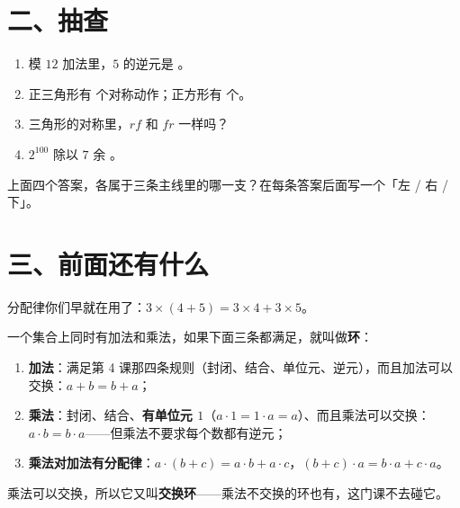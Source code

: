 \section*{二、抽查}

\begin{dongshou}
  \begin{enumerate}
    \item 模 \(12\) 加法里，\(5\) 的逆元是 \underline{\hspace{3em}}。
    \item 正三角形有 \underline{\hspace{2em}} 个对称动作；正方形有 \underline{\hspace{2em}} 个。
    \item 三角形的对称里，\(rf\) 和 \(fr\) 一样吗？\underline{\hspace{4em}}
    \item \(2^{100}\) 除以 \(7\) 余 \underline{\hspace{2em}}。
  \end{enumerate}
\end{dongshou}

\begin{sikao}
  上面四个答案，各属于三条主线里的哪一支？在每条答案后面写一个「左 / 右 / 下」。
\end{sikao}

\section*{三、前面还有什么}

\noindent 分配律你们早就在用了：\(3\times(4+5)=3\times4+3\times5\)。

\begin{definition}[环]
  一个集合上同时有加法和乘法，如果下面三条都满足，就叫做\textbf{环}：
  \begin{enumerate}
    \item \textbf{加法}：满足第 4 课那四条规则（封闭、结合、单位元、逆元），而且加法可以交换：\(a+b=b+a\)；
    \item \textbf{乘法}：封闭、结合、\textbf{有单位元 \(1\)}（\(a\cdot1=1\cdot a=a\)）、而且乘法可以交换：\(a\cdot b=b\cdot a\)——但乘法不要求每个数都有逆元；
    \item \textbf{乘法对加法有分配律}：\(a\cdot(b+c)=a\cdot b+a\cdot c\)，\((b+c)\cdot a=b\cdot a+c\cdot a\)。
  \end{enumerate}
  乘法可以交换，所以它又叫\textbf{交换环}——乘法不交换的环也有，这门课不去碰它。
\end{definition}

